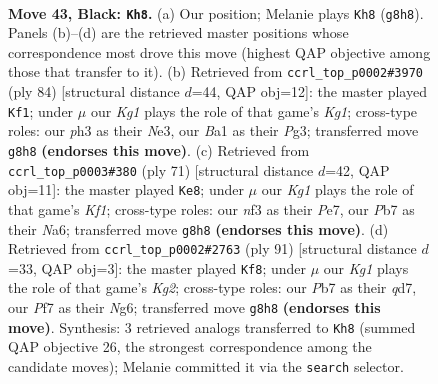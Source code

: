\documentclass[11pt]{article}
\begin{document}
\clearpage

\begin{figure}[p]\centering
\begin{subfigure}{0.46\textwidth}\centering
\resizebox{\linewidth}{!}{%
\newchessgame
\chessboard[
  setfen={6k1/1p3p2/6p1/p7/P6p/5N1P/4n1PK/b4q2 b - - 0 43},
  showmover=false,
  pgfstyle=straightmove, color=movearrow, markmove={g8-h8}
]}
\caption{}
\end{subfigure}\hfill
\begin{subfigure}{0.46\textwidth}\centering
\resizebox{\linewidth}{!}{%
\newchessgame
\chessboard[
  setfen={8/r7/3p1k1p/PRn3pP/4p3/4N1P1/5P2/6K1 w - - 5 43},
  showmover=false,
  pgfstyle=straightmove, color=movearrow, markmove={g1-f1}
]}
\caption{}
\end{subfigure}
\\[4pt]
\begin{subfigure}{0.46\textwidth}\centering
\resizebox{\linewidth}{!}{%
\newchessgame
\chessboard[
  setfen={5k2/4p2Q/n2p1p2/3P3p/q7/4N1P1/5PK1/8 b - - 0 36},
  showmover=false,
  pgfstyle=straightmove, color=movearrow, markmove={f8-e8}
]}
\caption{}
\end{subfigure}\hfill
\begin{subfigure}{0.46\textwidth}\centering
\resizebox{\linewidth}{!}{%
\newchessgame
\chessboard[
  setfen={8/3Q2kp/6n1/6P1/4N3/pPp5/P6q/1K6 b - - 5 46},
  showmover=false,
  pgfstyle=straightmove, color=movearrow, markmove={g7-f8}
]}
\caption{}
\end{subfigure}
\caption{\textbf{Move 43, Black: \texttt{Kh8}.} (a) Our position; Melanie plays \texttt{Kh8} (\texttt{g8h8}). Panels (b)--(d) are the retrieved master positions whose correspondence most drove this move (highest QAP objective among those that transfer to it). (b) Retrieved from \texttt{ccrl\_top\_p0002\#3970} (ply 84) [structural distance $d$=44, QAP obj=12]: the master played \texttt{Kf1}; under $\mu$ our \emph{Kg1} plays the role of that game's \emph{Kg1}; cross-type roles: our \emph{p}h3 as their \emph{N}e3, our \emph{B}a1 as their \emph{P}g3; transferred move \texttt{g8h8} \textbf{(endorses this move)}. (c) Retrieved from \texttt{ccrl\_top\_p0003\#380} (ply 71) [structural distance $d$=42, QAP obj=11]: the master played \texttt{Ke8}; under $\mu$ our \emph{Kg1} plays the role of that game's \emph{Kf1}; cross-type roles: our \emph{n}f3 as their \emph{P}e7, our \emph{P}b7 as their \emph{N}a6; transferred move \texttt{g8h8} \textbf{(endorses this move)}. (d) Retrieved from \texttt{ccrl\_top\_p0002\#2763} (ply 91) [structural distance $d$=33, QAP obj=3]: the master played \texttt{Kf8}; under $\mu$ our \emph{Kg1} plays the role of that game's \emph{Kg2}; cross-type roles: our \emph{P}b7 as their \emph{q}d7, our \emph{P}f7 as their \emph{N}g6; transferred move \texttt{g8h8} \textbf{(endorses this move)}. Synthesis: 3 retrieved analogs transferred to \texttt{Kh8} (summed QAP objective 26, the strongest correspondence among the candidate moves); Melanie committed it via the \texttt{search} selector.}
\label{fig:thought-m85}
\end{figure}
\end{document}

